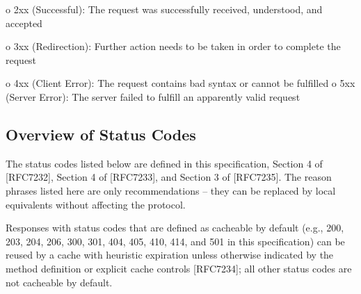    o  2xx (Successful): The request was successfully received,
      understood, and accepted

   o  3xx (Redirection): Further action needs to be taken in order to
      complete the request

   o  4xx (Client Error): The request contains bad syntax or cannot be
      fulfilled
      o  5xx (Server Error): The server failed to fulfill an apparently
      valid request

\subsection{Overview of Status Codes}

   The status codes listed below are defined in this specification,
   Section 4 of [RFC7232], Section 4 of [RFC7233], and Section 3 of
   [RFC7235].  The reason phrases listed here are only recommendations
   -- they can be replaced by local equivalents without affecting the
   protocol.

   Responses with status codes that are defined as cacheable by default
   (e.g., 200, 203, 204, 206, 300, 301, 404, 405, 410, 414, and 501 in
   this specification) can be reused by a cache with heuristic
   expiration unless otherwise indicated by the method definition or
   explicit cache controls [RFC7234]; all other status codes are not
   cacheable by default.

